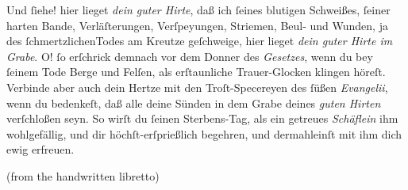 \documentclass[tocstyle=ref-genre]{ees}
\begin{document}
Und ſiehe! hier lieget \textit{dein guter Hirte}, daß ich ſeines blutigen Schweißes, ſeiner harten Bande, Verläſterungen, Verſpeyungen, Striemen, Beul- und Wunden, ja des ſchmertzlichenTodes am Kreutze geſchweige, hier lieget \textit{dein guter Hirte im Grabe}. O! ſo erſchrick demnach vor dem Donner des \textit{Gesetzes}, wenn du bey ſeinem Tode Berge und Felſen, als erſtaunliche Trauer-Glocken klingen höreſt. Verbinde aber auch dein Hertze mit den Troſt-Specereyen des ſüßen \textit{Evangelii}, wenn du bedenkeſt, daß alle deine Sünden in dem Grabe deines \textit{guten Hirten} verſchloßen seyn. So wirſt du ſeinen Sterbens-Tag, als ein getreues \textit{Schäflein} ihm wohlgefällig, und dir höchſt-erſprießlich begehren, und dermahleinſt mit ihm dich ewig erfreuen.

(from the handwritten libretto)
\fi
\end{document}
